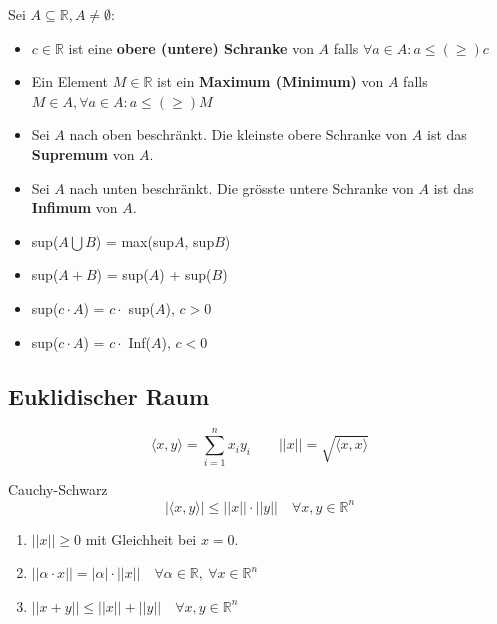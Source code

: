 \documentclass[a4paper,fontsize = 7pt]{scrartcl}
\def\R{\mathbb{R}}
\begin{document}
Sei $A \subseteq \R, A \neq \emptyset$: 
\begin{itemize}
  \item $c \in \R$ ist eine \textbf{obere (untere) Schranke} von $A$ falls $\forall a \in A: a \leq (\geq) c$
  \item Ein Element $M \in \R$ ist ein \textbf{Maximum (Minimum)} von $A$ falls $M \in A, \forall a \in A: a \leq (\geq) M$
  \item Sei $A$ nach oben beschränkt. Die kleinste obere Schranke von $A$ ist das \textbf{Supremum} von $A$.
  \item Sei $A$ nach unten beschränkt. Die grösste untere Schranke von $A$ ist das \textbf{Infimum} von $A$.
  
  \item sup({$A \bigcup B$}) = max{(sup$A$, sup$B$)}
  \item sup{($A + B$)} = sup($A$) + sup($B$)
  \item sup($c \cdot A$) = $c \cdot $ sup($A$), $c > 0$
  \item sup($c \cdot A$) = $c \cdot$ Inf($A$), $c < 0$
\end{itemize}

\subsection{Euklidischer Raum}
\begin{equation*}
    \langle x, y \rangle = \sum_{i=1}^n x_i y_i \qquad ||x|| = \sqrt{\langle x,x \rangle}
\end{equation*}
\begin{subbox}{Cauchy-Schwarz}
  \vspace{-6pt}
    \begin{equation*}
        |\langle x, y \rangle| \leq ||x|| \cdot ||y|| \quad \forall x,y \in \R^n
    \end{equation*}
    \vspace{-16pt}
\end{subbox}
\begin{subbox}{1.22}
  \vspace{-4pt}
    \begin{enumerate}
        \item $||x|| \geq 0$ mit Gleichheit bei $x=0$.
        \item $||\alpha \cdot x|| = |\alpha|\cdot ||x|| \quad \forall \alpha \in \R,~\forall x \in \R^n$
        \item $||x+y|| \leq ||x|| + ||y|| \quad \forall x,y \in \R^n$
    \end{enumerate}
    \vspace{-12pt}
\end{subbox}
\end{document}
